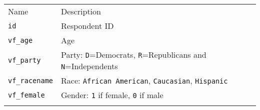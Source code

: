 \documentclass[]{article}
\begin{document}
\begin{longtable}[c]{@{}ll@{}}
\toprule\addlinespace
\begin{minipage}[b]{0.34\columnwidth}\raggedright
Name
\end{minipage} & \begin{minipage}[b]{0.59\columnwidth}\raggedright
Description
\end{minipage}
\\\addlinespace
\midrule\endhead
\begin{minipage}[t]{0.34\columnwidth}\raggedright
\texttt{id}
\end{minipage} & \begin{minipage}[t]{0.59\columnwidth}\raggedright
Respondent ID
\end{minipage}
\\\addlinespace
\begin{minipage}[t]{0.34\columnwidth}\raggedright
\texttt{vf\_age}
\end{minipage} & \begin{minipage}[t]{0.59\columnwidth}\raggedright
Age
\end{minipage}
\\\addlinespace
\begin{minipage}[t]{0.34\columnwidth}\raggedright
\texttt{vf\_party}
\end{minipage} & \begin{minipage}[t]{0.59\columnwidth}\raggedright
Party: \texttt{D}=Democrats, \texttt{R}=Republicans and
\texttt{N}=Independents
\end{minipage}
\\\addlinespace
\begin{minipage}[t]{0.34\columnwidth}\raggedright
\texttt{vf\_racename}
\end{minipage} & \begin{minipage}[t]{0.59\columnwidth}\raggedright
Race: \texttt{African American}, \texttt{Caucasian}, \texttt{Hispanic}
\end{minipage}
\\\addlinespace
\begin{minipage}[t]{0.34\columnwidth}\raggedright
\texttt{vf\_female}
\end{minipage} & \begin{minipage}[t]{0.59\columnwidth}\raggedright
Gender: \texttt{1} if female, \texttt{0} if male
\end{minipage}
\\\addlinespace
\begin{minipage}[t]{0.34\columnwidth}\raggedright

\end{minipage}
\end{longtable}
\end{document}
